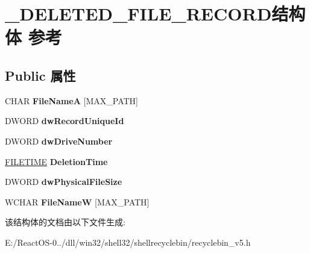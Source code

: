 \hypertarget{struct___d_e_l_e_t_e_d___f_i_l_e___r_e_c_o_r_d}{}\section{\+\_\+\+D\+E\+L\+E\+T\+E\+D\+\_\+\+F\+I\+L\+E\+\_\+\+R\+E\+C\+O\+R\+D结构体 参考}
\label{struct___d_e_l_e_t_e_d___f_i_l_e___r_e_c_o_r_d}
\subsection*{Public 属性}
\begin{DoxyCompactItemize}
\item 
\mbox{\label{struct___d_e_l_e_t_e_d___f_i_l_e___r_e_c_o_r_d_a30f8bb4f7d659843e6dd89169366aaaf}} 
C\+H\+AR {\bfseries File\+NameA} \mbox{[}M\+A\+X\+\_\+\+P\+A\+TH\mbox{]}
\item 
\mbox{\label{struct___d_e_l_e_t_e_d___f_i_l_e___r_e_c_o_r_d_a4895b766fe1aaa5935349e82ee1ef0b3}} 
D\+W\+O\+RD {\bfseries dw\+Record\+Unique\+Id}
\item 
\mbox{\label{struct___d_e_l_e_t_e_d___f_i_l_e___r_e_c_o_r_d_a1e909f20ea159a6418d569ecb6a23cb9}} 
D\+W\+O\+RD {\bfseries dw\+Drive\+Number}
\item 
\mbox{\label{struct___d_e_l_e_t_e_d___f_i_l_e___r_e_c_o_r_d_a353df9ead0516ef85b88cea196d61976}} 
\hyperlink{struct___f_i_l_e_t_i_m_e}{F\+I\+L\+E\+T\+I\+ME} {\bfseries Deletion\+Time}
\item 
\mbox{\label{struct___d_e_l_e_t_e_d___f_i_l_e___r_e_c_o_r_d_a5db225e0940f2dc024d3168155bfd9a0}} 
D\+W\+O\+RD {\bfseries dw\+Physical\+File\+Size}
\item 
\mbox{\label{struct___d_e_l_e_t_e_d___f_i_l_e___r_e_c_o_r_d_a5bcf41b4ea982ecaa57a4c246ed0c8a5}} 
W\+C\+H\+AR {\bfseries File\+NameW} \mbox{[}M\+A\+X\+\_\+\+P\+A\+TH\mbox{]}
\end{DoxyCompactItemize}


该结构体的文档由以下文件生成\+:\begin{DoxyCompactItemize}
\item 
E\+:/\+React\+O\+S-\/0../dll/win32/shell32/shellrecyclebin/recyclebin\+\_\+v5.\+h\end{DoxyCompactItemize}
